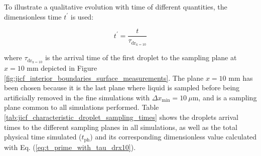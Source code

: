 To illustrate a qualitative evolution with time of different quantities, the dimensionless time $t^{\prime} $ is used:

\begin{equation}
\label{eq:t_prime_with_tau_drx10}
t^{\prime} = \frac{t}{\tau_\mathrm{dr_{x=10}}}
\end{equation}

where $\tau_\mathrm{dr_{x=10}}$ is the arrival time of the first droplet to the sampling plane at $x = 10$ mm depicted in Figure \ref{fig:jicf_interior_boundaries_surface_measurements}. The plane $x = 10$ mm has been chosen because it is the last plane where liquid is sampled before being artificially removed in the fine simulations with $\Delta x_\mathrm{min} = 10 ~\mu$m, and is a sampling plane common to all simulations performed. Table \ref{tab:jicf_characteristic_droplet_sampling_times} shows the droplets arrival times to the different sampling planes in all simulations, as well as the total physical time simulated ($t_\mathrm{ph}$) and its corresponding dimensionless value calculated with Eq. (\ref{eq:t_prime_with_tau_drx10}).




